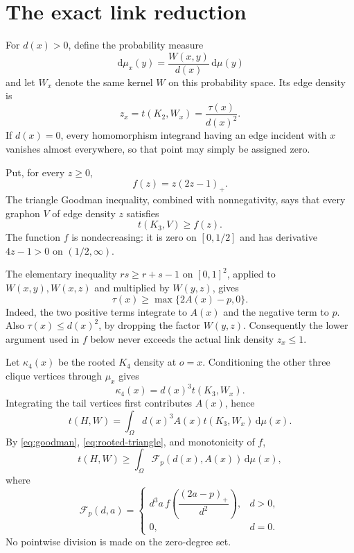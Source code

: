 \documentclass[11pt]{article}
\newcommand{\dd}{\,\mathrm d}
\begin{document}
\section{The exact link reduction}

For $d(x)>0$, define the probability measure
\[
 \dd\mu_x(y)=\frac{W(x,y)}{d(x)}\dd\mu(y)
\]
and let $W_x$ denote the same kernel $W$ on this probability space.  Its
edge density is
\begin{equation}
 z_x=t(K_2,W_x)=\frac{\tau(x)}{d(x)^2}.
 \label{eq:link-edge}
\end{equation}
If $d(x)=0$, every homomorphism integrand having an edge incident with $x$
vanishes almost everywhere, so that point may simply be assigned zero.

Put, for every $z\geq0$,
\[
 f(z)=z(2z-1)_+.
\]
The triangle Goodman inequality, combined with nonnegativity, says that
every graphon $V$ of edge density $z$ satisfies
\begin{equation}
 t(K_3,V)\geq f(z).
 \label{eq:goodman}
\end{equation}
The function $f$ is nondecreasing: it is zero on $[0,1/2]$ and has
derivative $4z-1>0$ on $(1/2,\infty)$.

The elementary inequality $rs\geq r+s-1$ on $[0,1]^2$, applied to
$W(x,y),W(x,z)$ and multiplied by $W(y,z)$, gives
\begin{equation}
 \tau(x)\geq\max\{2A(x)-p,0\}.
 \label{eq:rooted-triangle}
\end{equation}
Indeed, the two positive terms integrate to $A(x)$ and the negative term
to $p$.  Also $\tau(x)\leq d(x)^2$, by dropping the factor $W(y,z)$.
Consequently the lower argument used in $f$ below never exceeds the actual
link density $z_x\leq1$.

Let $\kappa_4(x)$ be the rooted $K_4$ density at $o=x$.  Conditioning the
other three clique vertices through $\mu_x$ gives
\[
 \kappa_4(x)=d(x)^3t(K_3,W_x).
\]
Integrating the tail vertices first contributes $A(x)$, hence
\begin{equation}
 t(H,W)=\int_\Omega d(x)^3A(x)t(K_3,W_x)\dd\mu(x).
 \label{eq:link-identity}
\end{equation}
By \eqref{eq:goodman}, \eqref{eq:rooted-triangle}, and monotonicity of $f$,
\begin{equation}
 t(H,W)\geq\int_\Omega \mathcal F_p(d(x),A(x))\dd\mu(x),
 \label{eq:scalar-reduction}
\end{equation}
where
\begin{equation}
 \mathcal F_p(d,a)=
 \begin{cases}
 d^3a\,f\!\left(\dfrac{(2a-p)_+}{d^2}\right),&d>0,\\[6pt]
 0,&d=0.
 \end{cases}
 \label{eq:F}
\end{equation}
No pointwise division is made on the zero-degree set.
\end{document}
